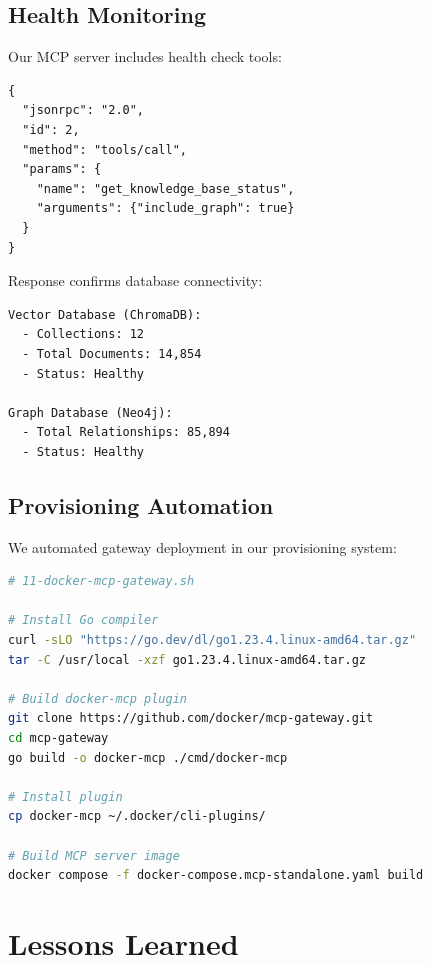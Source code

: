 \documentclass[11pt,letterpaper]{article}
\begin{document}
\subsection{Health Monitoring}

Our MCP server includes health check tools:

\begin{lstlisting}[caption={Health Check Tool Call}]
{
  "jsonrpc": "2.0",
  "id": 2,
  "method": "tools/call",
  "params": {
    "name": "get_knowledge_base_status",
    "arguments": {"include_graph": true}
  }
}
\end{lstlisting}

Response confirms database connectivity:

\begin{lstlisting}[caption={Health Check Response}]
Vector Database (ChromaDB):
  - Collections: 12
  - Total Documents: 14,854
  - Status: Healthy

Graph Database (Neo4j):
  - Total Relationships: 85,894
  - Status: Healthy
\end{lstlisting}

\subsection{Provisioning Automation}

We automated gateway deployment in our provisioning system:

\begin{lstlisting}[language=bash,caption={Provisioning Script (excerpt)}]
# 11-docker-mcp-gateway.sh

# Install Go compiler
curl -sLO "https://go.dev/dl/go1.23.4.linux-amd64.tar.gz"
tar -C /usr/local -xzf go1.23.4.linux-amd64.tar.gz

# Build docker-mcp plugin
git clone https://github.com/docker/mcp-gateway.git
cd mcp-gateway
go build -o docker-mcp ./cmd/docker-mcp

# Install plugin
cp docker-mcp ~/.docker/cli-plugins/

# Build MCP server image
docker compose -f docker-compose.mcp-standalone.yaml build
\end{lstlisting}

\section{Lessons Learned}
\end{document}
